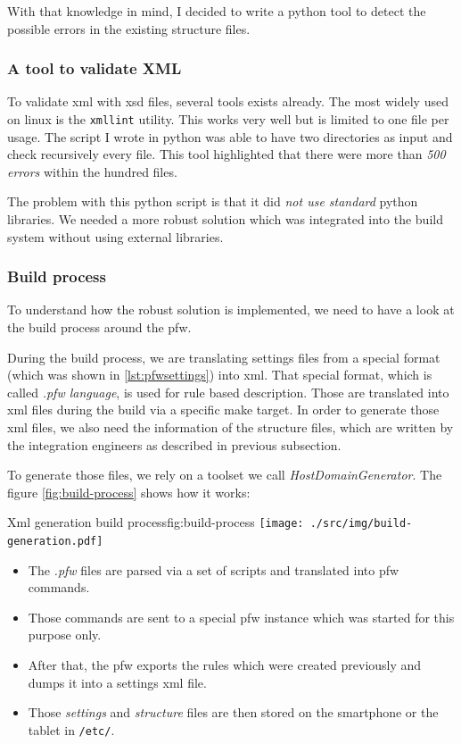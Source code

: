 With that knowledge in mind, I decided to write a \gls{python} tool to detect the possible errors in the existing structure files.

\subsubsection{A tool to validate XML}
To validate \gls{xml} with \gls{xsd} files, several tools exists already. The most widely used on linux is the \lstinline{xmllint} utility.
This works very well but is limited to one file per usage. The script I wrote in \gls{python} was able to have two directories as input and check
recursively every file.
This tool highlighted that there were more than \emph{500 errors} within the hundred files.

The problem with this \gls{python} script is that it did \emph{not use standard} \gls{python} libraries.
We needed a more robust solution which was integrated into the build system without using external libraries.

\subsubsection{Build process}
To understand how the robust solution is implemented, we need to have a look at the build process around the \gls{pfw}.

During the build process, we are translating settings files from a special format (which was shown in \ref{lst:pfwsettings}) into \gls{xml}.
That special format, which is called \emph{.pfw language}, is used for rule based
description. Those are translated into \gls{xml} files during the build via a
specific make target.  In order to generate those \gls{xml} files, we also need
the information of the structure files, which are written by the integration
engineers as described in previous subsection.

To generate those files, we rely on a toolset we call \emph{HostDomainGenerator}.
The figure \ref{fig:build-process} shows how it works:

\begin{figureGraphics}{Xml generation build process}{fig:build-process}
    \texttt{[image: ./src/img/build-generation.pdf]}
\end{figureGraphics}

\begin{itemize}
    \item The \emph{.pfw} files are parsed via a set of scripts and translated into \gls{pfw} commands.
    \item Those commands are sent to a special \gls{pfw} instance which was started for this purpose only.
    \item After that, the \gls{pfw} exports the rules which were created previously and dumps it into a settings \gls{xml} file.
    \item Those \emph{settings} and \emph{structure} files are then stored on the smartphone or the tablet in \lstinline{/etc/}.
\end{itemize}

